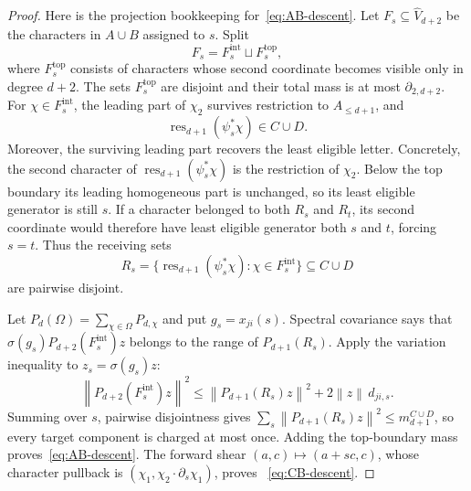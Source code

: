 \documentclass[11pt]{amsart}
\theoremstyle{definition}
\theoremstyle{plain}
\newcommand{\norm}[1]{\left\lVert#1\right\rVert}
\begin{document}
\begin{proof}
Here is the projection bookkeeping for~\eqref{eq:AB-descent}.  Let
\(F_s\subseteq\widehat V_{d+2}\) be the characters in \(A\cup B\)
assigned to \(s\).  Split
\[
 F_s=F_s^{\mathrm{int}}\sqcup F_s^{\mathrm{top}},
\]
where \(F_s^{\mathrm{top}}\) consists of characters whose second
coordinate becomes visible only in degree \(d+2\).  The sets
\(F_s^{\mathrm{top}}\) are disjoint and their total mass is at most
\(\partial_{2,d+2}\).  For \(\chi\in F_s^{\mathrm{int}}\), the
leading part of \(\chi_2\) survives restriction to
\(A_{\le d+1}\), and
\[
 \operatorname{res}_{d+1}(\psi_s^*\chi)\in C\cup D.
\]
Moreover, the surviving leading part recovers the least eligible
letter.  Concretely, the second character of
\(\operatorname{res}_{d+1}(\psi_s^*\chi)\) is the restriction of
\(\chi_2\).  Below the top boundary its leading homogeneous part is
unchanged, so its least eligible generator is still \(s\).  If a
character belonged to both \(R_s\) and \(R_t\), its second coordinate
would therefore have least eligible generator both \(s\) and \(t\),
forcing \(s=t\).  Thus the receiving sets
\[
 R_s=\{\operatorname{res}_{d+1}(\psi_s^*\chi):
          \chi\in F_s^{\mathrm{int}}\}
 \subseteq C\cup D
\]
are pairwise disjoint.

Let \(P_d(\Omega)=\sum_{\chi\in\Omega}P_{d,\chi}\) and put
\(g_s=x_{ji}(s)\).  Spectral covariance says that
\(\sigma(g_s)P_{d+2}(F_s^{\mathrm{int}})z\) belongs to the range of
\(P_{d+1}(R_s)\).  Apply the variation inequality to
\(z_s=\sigma(g_s)z\):
\[
 \norm{P_{d+2}(F_s^{\mathrm{int}})z}^2
 \le \norm{P_{d+1}(R_s)z}^2
      +2\norm z\,d_{ji,s}.
\]
Summing over \(s\), pairwise disjointness gives
\(\sum_s\norm{P_{d+1}(R_s)z}^2\le m_{d+1}^{C\cup D}\), so every
target component is charged at most once.  Adding the top-boundary
mass proves~\eqref{eq:AB-descent}.  The forward shear
\((a,c)\mapsto(a+sc,c)\), whose character pullback is
\((\chi_1,\chi_2\cdot\partial_s\chi_1)\), proves
~\eqref{eq:CB-descent}.


\end{proof}
\end{document}
